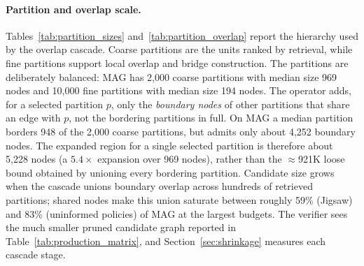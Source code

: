 \documentclass[runningheads]{llncs}
\begin{document}
\paragraph{Partition and overlap scale.}
Tables~\ref{tab:partition_sizes} and~\ref{tab:partition_overlap} report the hierarchy used by the overlap cascade. Coarse partitions are the units ranked by retrieval, while fine partitions support local overlap and bridge construction. The partitions are deliberately balanced: MAG has 2,000 coarse partitions with median size 969 nodes and 10,000 fine partitions with median size 194 nodes. The operator adds, for a selected partition $p$, only the \emph{boundary nodes} of other partitions that share an edge with $p$, not the bordering partitions in full. On MAG a median partition borders 948 of the 2{,}000 coarse partitions, but admits only about 4{,}252 boundary nodes. The expanded region for a single selected partition is therefore about 5{,}228 nodes (a $5.4\times$ expansion over 969 nodes), rather than the $\approx$921K loose bound obtained by unioning every bordering partition. Candidate size grows when the cascade unions boundary overlap across hundreds of retrieved partitions; shared nodes make this union saturate between roughly 59\% (Jigsaw) and 83\% (uninformed policies) of MAG at the largest budgets. The verifier sees the much smaller pruned candidate graph reported in Table~\ref{tab:production_matrix}, and Section~\ref{sec:shrinkage} measures each cascade stage.

\begin{table}[H]
\centering
\caption{\textbf{Partition balance.} Coarse partitions are ranked by retrieval; fine partitions support local overlap and bridge construction. Node counts are per partition.}
\label{tab:partition_sizes}
\scriptsize
\resizebox{\textwidth}{!}{}
\end{table}

\begin{table}[H]
\centering
\caption{\textbf{Overlap expansion scale, stated precisely.} ``+Boundary overlap'' is the median number of boundary nodes admitted for one selected partition; ``Expanded part'' is partition plus boundary overlap. ``Neighbor parts'' counts bordering partitions. ``Loose union bound'' is the median size obtained by taking every bordering partition in full, which the operator does not do. Realized per-partition overlap is $5.4\times$ on MAG; breadth arises only when unions are formed across the retrieval budget.}
\label{tab:partition_overlap}
\footnotesize
\resizebox{\textwidth}{!}{}
\end{table}
\end{document}
